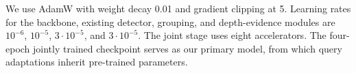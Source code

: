 We use AdamW with weight decay 0.01 and gradient clipping at 5. Learning rates for the backbone, existing detector, grouping, and depth-evidence modules are $10^{-6}$, $10^{-5}$, $3\cdot10^{-5}$, and $3\cdot10^{-5}$. The joint stage uses eight accelerators. The four-epoch jointly trained checkpoint serves as our primary model, from which query adaptations inherit pre-trained parameters.
